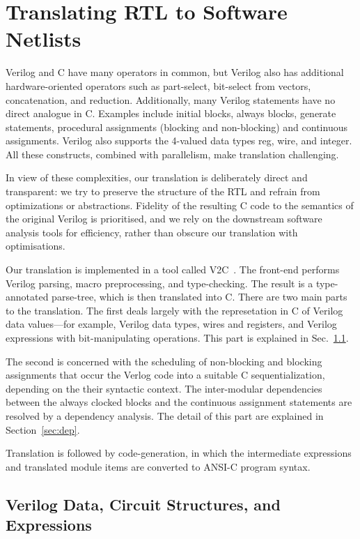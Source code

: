 \section{Translating RTL to Software Netlists}\label{sec:v2c}
%  
Verilog and C have many operators in common, but  Verilog also has
additional hardware-oriented operators such as part-select, bit-select from vectors, concatenation,
and reduction. Additionally, many Verilog statements have no direct analogue in C. Examples include
initial blocks, always blocks, generate statements, procedural assignments
(blocking and non-blocking) and continuous assignments. Verilog also supports the 4-valued data types
reg, wire, and integer.  All these constructs, combined with
parallelism, make translation challenging.

In view of these complexities, our translation is deliberately direct and transparent: we try to
preserve the structure of the RTL and refrain from optimizations or abstractions. Fidelity of the
resulting C code to the semantics of the original Verilog is prioritised, and we rely on
the downstream software analysis tools for efficiency, rather than obscure our translation with
optimisations.

Our translation is implemented in a tool called V2C~\cite{mtk2016}. The front-end performs Verilog parsing, macro preprocessing, and
type-checking. The result is a type-annotated parse-tree, which is then translated into C. There are two main parts to the translation. The first deals
largely with the represetation in C of Verilog data values---for example, Verilog data types, wires and registers, and Verilog expressions with bit-manipulating operations. This part is explained in Sec.~\ref{sec:data}.

The second is concerned with the scheduling of non-blocking and blocking  assignments that occur the Verlog code into a suitable C sequentialization, depending on the their syntactic context. The inter-modular dependencies between the always clocked blocks and the continuous assignment statements are resolved by a dependency analysis. The detail of this part are explained in Section~\ref{sec:dep}.

Translation is followed by code-generation, in which the intermediate   expressions and translated module items are converted to ANSI-C program syntax.

\subsection{Verilog Data, Circuit Structures, and Expressions}\label{sec:data}

